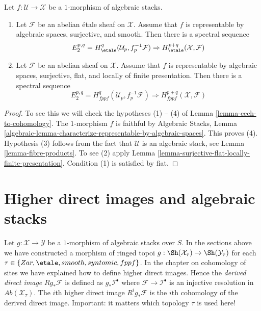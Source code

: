 \begin{proposition}
\label{proposition-smooth-covering-compute-cohomology}
Let $f : \mathcal{U} \to \mathcal{X}$ be a $1$-morphism of algebraic stacks.
\begin{enumerate}
\item Let $\mathcal{F}$ be an abelian \'etale sheaf on $\mathcal{X}$.
Assume that $f$ is representable by algebraic spaces, surjective, and smooth.
Then there is a spectral sequence
$$
E_2^{p, q} = H^q_\etale(\mathcal{U}_p, f_p^{-1}\mathcal{F})
\Rightarrow
H^{p + q}_\etale(\mathcal{X}, \mathcal{F})
$$
\item Let $\mathcal{F}$ be an abelian sheaf on $\mathcal{X}$.
Assume that $f$ is representable by algebraic spaces, surjective, flat,
and locally of finite presentation. Then there is
a spectral sequence
$$
E_2^{p, q} = H^q_{fppf}(\mathcal{U}_p, f_p^{-1}\mathcal{F})
\Rightarrow
H^{p + q}_{fppf}(\mathcal{X}, \mathcal{F})
$$
\end{enumerate}
\end{proposition}

\begin{proof}
To see this we will check the hypotheses (1) -- (4) of
Lemma \ref{lemma-cech-to-cohomology}.
The $1$-morphism $f$ is faithful by
Algebraic Stacks, Lemma
\ref{algebraic-lemma-characterize-representable-by-algebraic-spaces}.
This proves (4).
Hypothesis (3) follows from the fact that $\mathcal{U}$ is an algebraic
stack, see
Lemma \ref{lemma-fibre-products}.
To see (2) apply
Lemma \ref{lemma-surjective-flat-locally-finite-presentation}.
Condition (1) is satisfied by fiat.
\end{proof}










\section{Higher direct images and algebraic stacks}
\label{section-higher-direct-images}

\noindent
Let $g : \mathcal{X} \to \mathcal{Y}$ be a $1$-morphism of algebraic stacks
over $S$. In the sections above we have constructed a morphism of ringed
topoi $g : \Sh(\mathcal{X}_\tau) \to \Sh(\mathcal{Y}_\tau)$
for each $\tau \in \{Zar, \etale, smooth, syntomic, fppf\}$.
In the chapter on cohomology of sites we have explained how to
define higher direct images. Hence the {\it derived direct image}
$Rg_*\mathcal{F}$ is defined as $g_*\mathcal{I}^\bullet$ where
$\mathcal{F} \to \mathcal{I}^\bullet$ is an injective resolution in
$\textit{Ab}(\mathcal{X}_\tau)$. The $i$th higher direct image
$R^ig_*\mathcal{F}$ is the $i$th cohomology of the derived direct image.
Important: it matters which topology $\tau$ is used here!

